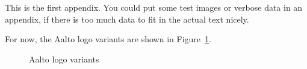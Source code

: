 \documentclass[12pt,a4paper,oneside,pdftex]{report}
\begin{document}
This is the first appendix. You could put some test images or verbose data in an
appendix, if there is too much data to fit in the actual text nicely.

For now, the Aalto logo variants are shown in Figure~\ref{fig:aaltologo}.

\begin{figure}
\begin{center}
\caption{Aalto logo variants}
\label{fig:aaltologo}
\end{center}
\end{figure}


\end{document}
